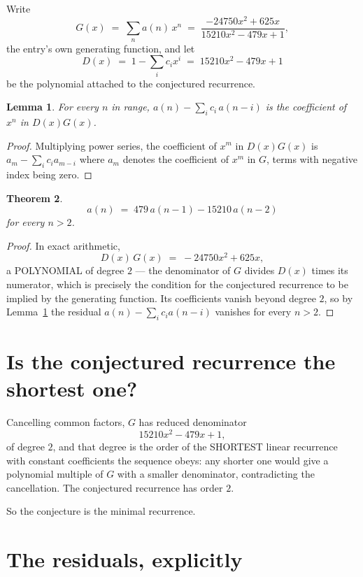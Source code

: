\documentclass[11pt,a4paper]{article}
\theoremstyle{plain}
\newtheorem{theorem}{Theorem}
\newtheorem{lemma}[theorem]{Lemma}
\theoremstyle{definition}
\begin{document}
Write
\[
G(x)\;=\;\sum_{n}a(n)\,x^{n}\;=\;\frac{- 24750 x^{2} + 625 x}{15210 x^{2} - 479 x + 1},
\]
the entry's own generating function, and let
\[
D(x)\;=\;1-\sum_i c_i x^{i}\;=\;15210 x^{2} - 479 x + 1
\]
be the polynomial attached to the conjectured recurrence.

\begin{lemma}\label{lem:key}
For every $n$ in range, $a(n)-\sum_i c_i\,a(n-i)$ is the coefficient of $x^{n}$ in
$D(x)G(x)$.
\end{lemma}

\begin{proof}
Multiplying power series, the coefficient of $x^{m}$ in $D(x)G(x)$ is
$a_m-\sum_i c_i a_{m-i}$ where $a_m$ denotes the coefficient of $x^{m}$ in $G$, terms with
negative index being zero.
\end{proof}

\begin{theorem}
\[
a(n)\;=\;479\,a(n-1) - 15210\,a(n-2)
\]
for every $n>2$.
\end{theorem}

\begin{proof}
In exact arithmetic,
\[
D(x)\,G(x)\;=\;- 24750 x^{2} + 625 x,
\]
a POLYNOMIAL of degree $2$ --- the denominator of $G$ divides $D(x)$ times its numerator,
which is precisely the condition for the conjectured recurrence to be implied by the
generating function. Its coefficients vanish beyond degree $2$, so by
Lemma~\ref{lem:key} the residual $a(n)-\sum_ic_ia(n-i)$ vanishes for every
$n>2$.
\end{proof}

\section{Is the conjectured recurrence the shortest one?}

Cancelling common factors, $G$ has reduced denominator
\[
15210 x^{2} - 479 x + 1,
\]
of degree $2$, and that degree is the order of the SHORTEST linear recurrence with
constant coefficients the sequence obeys: any shorter one would give a polynomial multiple of
$G$ with a smaller denominator, contradicting the cancellation. The conjectured recurrence has
order $2$.

So the conjecture is the minimal recurrence.

\section{The residuals, explicitly}
\end{document}
